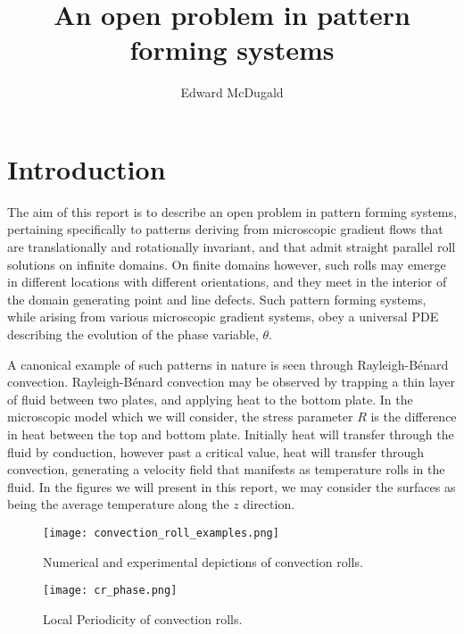 \documentclass[12pt]{article}
\title{An open problem in pattern forming systems}
\author{Edward McDugald}
\numberwithin{equation}{section}
\begin{document}
\maketitle
\section{Introduction}
\par The aim of this report is to describe an open problem in pattern forming systems, pertaining specifically to patterns deriving from microscopic gradient flows that are translationally and rotationally invariant, and that admit straight parallel roll solutions on infinite domains. On finite domains however, such rolls may emerge in different locations with different orientations, and they meet in the interior of the domain generating point and line defects. Such pattern forming systems, while arising from various microscopic gradient systems, obey a universal PDE describing the evolution of the phase variable, $\theta$. 
\par A canonical example of such patterns in nature is seen through Rayleigh-B\'{e}nard convection. Rayleigh-B\'{e}nard convection may be observed by trapping a thin layer of fluid between two plates, and applying heat to the bottom plate. In the microscopic model which we will consider, the stress parameter $R$ is the difference in heat between the top and bottom plate. Initially heat will transfer through the fluid by conduction, however past a critical value, heat will transfer through convection, generating a velocity field that manifests as temperature rolls in the fluid. In the figures we will present in this report, we may consider the surfaces as being the average temperature along the $z$ direction. 
\begin{figure}
\centering
\texttt{[image: convection\_roll\_examples.png]}
\caption{Numerical and experimental depictions of convection rolls.}
\end{figure}

\begin{figure}
\centering
\texttt{[image: cr\_phase.png]}
\caption{Local Periodicity of convection rolls.}
\end{figure}
\end{document}
